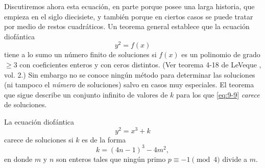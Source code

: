 \documentclass[12pt,a4paper]{book}
\begin{document}
    Discutiremos ahora esta ecuación, en parte porque posee una larga historia, que empieza
    en el siglo diecisiete, y también porque en ciertos casos se puede tratar por medio de
    restos cuadráticos. Un teorema general establece que la ecuación diofántica
    \begin{equation*}
        y^{2}=f(x)
    \end{equation*}
    tiene a lo sumo un número finito de soluciones si $f(x)$ es un polinomio de grado
    $\geq3$ con coeficientes enteros y con ceros distintos. (Ver teorema 4-18 de LeVeque
    \cite{leveque1956}, vol. 2.) Sin embargo no se conoce ningún método para determinar las soluciones
    (ni tampoco el \textit{número} de soluciones) salvo en casos muy especiales. El teorema
    que sigue describe un conjunto infinito de valores de $k$ para los que \eqref{eq:9-9}
    \textit{carece} de soluciones.

    \begin{teorema}\label{teo:9-12}
        La ecuación diofántica
        \begin{equation}\label{eq:9-10}
            y^{2}=x^{3}+k
        \end{equation}
        carece de soluciones si $k$ es de la forma
        \begin{equation}\label{eq:9-11}
            k=(4n-1)^{3}-4m^{2},
        \end{equation}
        en donde $m$ y $n$ son enteros tales que ningún primo $p\equiv-1\pmod{4}$ divide a
        $m$.
    \end{teorema}
\end{document}
